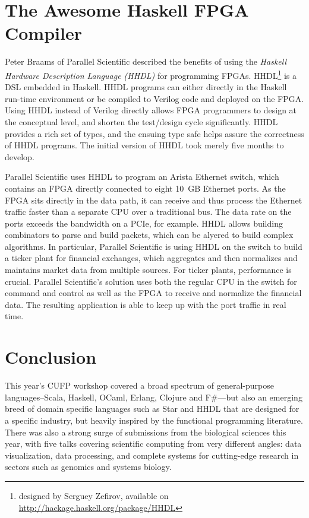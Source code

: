 \documentclass{jfp1}
\begin{document}
\section{The Awesome Haskell FPGA Compiler}

Peter Braams of Parallel Scientific described the benefits of using
the \textit{Haskell Hardware Description Language (HHDL)} for
programming FPGAs.  HHDL\footnote{designed by Serguey Zefirov,
  available on \url{http://hackage.haskell.org/package/HHDL}} is a DSL
embedded in Haskell.  HHDL programs can either directly in the Haskell
run-time environment or be compiled to Verilog code and deployed on
the FPGA.  Using HHDL instead of Verilog directly allows FPGA
programmers to design at the conceptual level, and shorten the
test/design cycle significantly.  HHDL provides a rich set of types,
and the ensuing type safe helps assure the correctness of HHDL
programs.  The initial version of HHDL took merely five months to
develop.

Parallel Scientific uses HHDL to program an Arista Ethernet switch,
which contains an FPGA directly connected to eight 10~GB Ethernet
ports.  As the FPGA sits directly in the data path, it can receive and
thus process the Ethernet traffic faster than a separate CPU over a
traditional bus.  The data rate on the ports exceeds the bandwidth on
a PCIe, for example.  HHDL allows building combinators to parse and
build packets, which can be alyered to build complex algorithms.  In
particular, Parallel Scientific is using HHDL on the switch to build a
ticker plant for financial exchanges, which aggregates and then
normalizes and maintains market data from multiple sources.  For
ticker plants, performance is crucial.  Parallel Scientific's solution
uses both the regular CPU in the switch for command and control as
well as the FPGA to receive and normalize the financial data.  The
resulting application is able to keep up with the port traffic in real
time.

\section{Conclusion}

This year's CUFP workshop covered a broad spectrum of general-purpose 
languages--Scala, Haskell, OCaml, Erlang, Clojure and F\#---but also
an emerging breed of domain specific languages such as Star and HHDL
that are designed for a specific industry, but heavily inspired by
the functional programming literature.  There was also a strong surge
of submissions from the biological sciences this year, with five
talks covering scientific computing from very different angles: data
visualization, data processing, and complete systems for cutting-edge
research in sectors such as genomics and systems biology.
\end{document}
